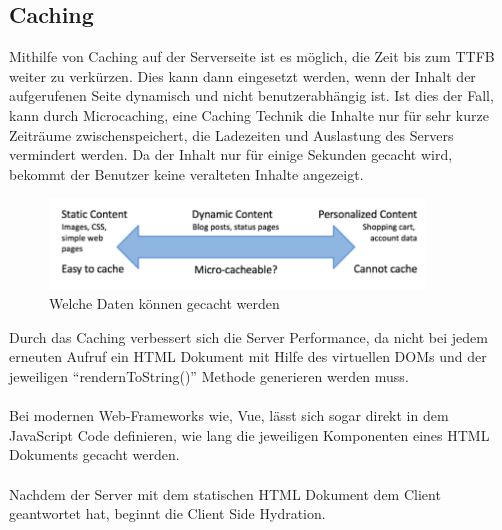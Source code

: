 \documentclass[runningheads]{llncs}
\begin{document}
\subsection{Caching}
\label{subsec:Caching}
Mithilfe von Caching auf der Serverseite ist es möglich, 
die Zeit bis zum TTFB weiter zu verkürzen. 
Dies kann dann eingesetzt werden, 
wenn der Inhalt der aufgerufenen Seite dynamisch und nicht benutzerabhängig ist. 
Ist dies der Fall, kann durch Microcaching, 
eine Caching Technik die Inhalte nur für sehr kurze Zeiträume zwischenspeichert, 
die Ladezeiten und Auslastung des Servers vermindert werden. 
Da der Inhalt nur für einige Sekunden gecacht wird, 
bekommt der Benutzer keine veralteten Inhalte angezeigt. 
\begin{figure}[h]
  \centering
  \includegraphics[width=10cm]{images/caching}
  \caption{Welche Daten können gecacht werden \cite{garett_2015}}
\end{figure}
Durch das Caching verbessert sich die Server Performance, 
da nicht bei jedem erneuten Aufruf ein HTML Dokument mit Hilfe des virtuellen DOMs und 
der jeweiligen “rendernToString()” Methode generieren werden muss. 
\\
\\
Bei modernen Web-Frameworks wie, Vue, 
lässt sich sogar direkt in dem JavaScript Code definieren, 
wie lang die jeweiligen Komponenten eines HTML Dokuments gecacht werden. 
\\
\\
Nachdem der Server mit dem statischen HTML Dokument dem Client geantwortet hat, 
beginnt die Client Side Hydration.
\end{document}
